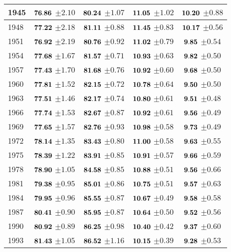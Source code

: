 \documentclass[10pt, titlepage]{article}%
\begin{document}
\begin{table}
\begin{tabular}{||l|c|c|c|c||}
  1945 &  $\bf 76.86$ $\pm 2.10$& $\bf 80.24$ $\pm 1.07$& $\bf 11.05$ $\pm 1.02$& $\bf 10.20$ $\pm 0.88$ \\ \hline\hline
  1948 &  $\bf 77.22$ $\pm 2.18$& $\bf 81.11$ $\pm 0.88$& $\bf 11.45$ $\pm 0.83$& $\bf 10.17$ $\pm 0.56$ \\ \hline\hline
  1951 &  $\bf 76.92$ $\pm 2.19$& $\bf 80.76$ $\pm 0.92$& $\bf 11.02$ $\pm 0.79$& $\bf 9.85$ $\pm 0.54$ \\ \hline\hline
  1954 &  $\bf 77.68$ $\pm 1.67$& $\bf 81.57$ $\pm 0.71$& $\bf 10.93$ $\pm 0.63$& $\bf 9.82$ $\pm 0.50$ \\ \hline\hline
  1957 &  $\bf 77.43$ $\pm 1.70$& $\bf 81.68$ $\pm 0.76$& $\bf 10.92$ $\pm 0.60$& $\bf 9.68$ $\pm 0.50$ \\ \hline\hline
  1960 &  $\bf 77.81$ $\pm 1.52$& $\bf 82.15$ $\pm 0.72$& $\bf 10.78$ $\pm 0.64$& $\bf 9.50$ $\pm 0.50$ \\ \hline\hline
  1963 &  $\bf 77.51$ $\pm 1.46$& $\bf 82.17$ $\pm 0.74$& $\bf 10.80$ $\pm 0.61$& $\bf 9.51$ $\pm 0.48$ \\ \hline\hline
  1966 &  $\bf 77.74$ $\pm 1.53$& $\bf 82.67$ $\pm 0.87$& $\bf 10.92$ $\pm 0.61$& $\bf 9.56$ $\pm 0.49$ \\ \hline\hline
  1969 &  $\bf 77.65$ $\pm 1.57$& $\bf 82.76$ $\pm 0.93$& $\bf 10.98$ $\pm 0.58$& $\bf 9.73$ $\pm 0.49$ \\ \hline\hline
  1972 &  $\bf 78.14$ $\pm 1.35$& $\bf 83.43$ $\pm 0.80$& $\bf 11.00$ $\pm 0.58$& $\bf 9.63$ $\pm 0.55$ \\ \hline\hline
  1975 &  $\bf 78.39$ $\pm 1.22$& $\bf 83.91$ $\pm 0.85$& $\bf 10.91$ $\pm 0.57$& $\bf 9.66$ $\pm 0.59$ \\ \hline\hline
  1978 &  $\bf 78.90$ $\pm 1.05$& $\bf 84.58$ $\pm 0.85$& $\bf 10.88$ $\pm 0.51$& $\bf 9.56$ $\pm 0.66$ \\ \hline\hline
  1981 &  $\bf 79.38$ $\pm 0.95$& $\bf 85.01$ $\pm 0.86$& $\bf 10.75$ $\pm 0.51$& $\bf 9.57$ $\pm 0.63$ \\ \hline\hline
  1984 &  $\bf 79.95$ $\pm 0.96$& $\bf 85.55$ $\pm 0.87$& $\bf 10.67$ $\pm 0.49$& $\bf 9.58$ $\pm 0.58$ \\ \hline\hline
  1987 &  $\bf 80.41$ $\pm 0.90$& $\bf 85.95$ $\pm 0.87$& $\bf 10.64$ $\pm 0.50$& $\bf 9.52$ $\pm 0.56$ \\ \hline\hline
  1990 &  $\bf 80.92$ $\pm 0.89$& $\bf 86.25$ $\pm 0.98$& $\bf 10.40$ $\pm 0.42$& $\bf 9.37$ $\pm 0.60$ \\ \hline\hline
  1993 &  $\bf 81.43$ $\pm 1.05$& $\bf 86.52$ $\pm 1.16$& $\bf 10.15$ $\pm 0.39$& $\bf 9.28$ $\pm 0.53$ \\ \hline\hline

\end{tabular}
\end{table}
\end{document}
